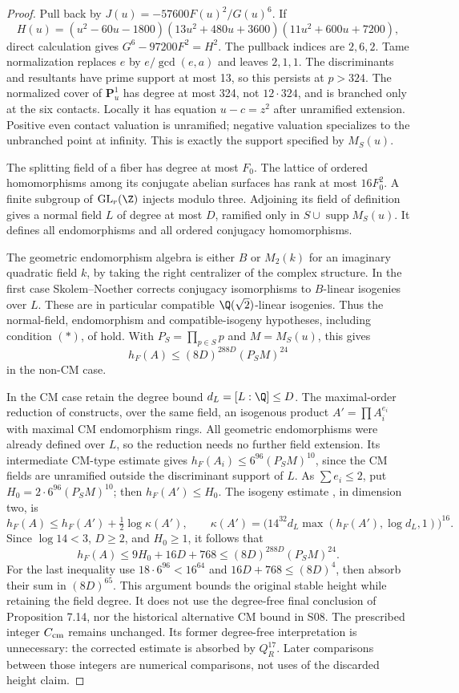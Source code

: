 \begin{proof}
Pull back by $J(u)=-57600F(u)^2/G(u)^6$. If
\[
 H(u)=(u^2-60u-1800)(13u^2+480u+3600)(11u^2+600u+7200),
\]
direct calculation gives $G^6-97200F^2=H^2$. The pullback indices are
$2,6,2$. Tame normalization replaces $e$ by $e/\gcd(e,a)$ and leaves
$2,1,1$. The discriminants and resultants have prime support at most 13,
so this persists at $p>324$. The normalized cover of $\mathbf P^1_u$
has degree at most 324, not $12\cdot324$, and is branched only at the
six contacts. Locally it has equation $u-c=z^2$ after unramified
extension. Positive even contact valuation is unramified; negative
valuation specializes to the unbranched point at infinity. This is
exactly the support specified by $M_S(u)$.

The splitting field of a fiber has degree at most $F_0$. The lattice
of ordered homomorphisms among its conjugate abelian surfaces has rank
at most $16F_0^2$. A finite subgroup of $\operatorname{GL}_r(\Z)$
injects modulo three. Adjoining its field of definition gives a normal
field $L$ of degree at most $D$, ramified only in
$S\cup\operatorname{supp}M_S(u)$. It defines all endomorphisms and all
ordered conjugacy homomorphisms.

The geometric endomorphism algebra is either $B$ or $M_2(k)$ for an
imaginary quadratic field $k$, by taking the right centralizer of the
complex structure. In the first case Skolem--Noether corrects conjugacy
isomorphisms to $B$-linear isogenies over $L$. These are in particular
compatible $\Q(\sqrt2)$-linear isogenies. Thus the normal-field,
endomorphism and compatible-isogeny hypotheses, including condition $(*)$,
of \cite[Eq. (7.1), Section 7.1.4, Proposition 7.13]{vkk} hold.
With $P_S=\prod_{p\in S}p$ and $M=M_S(u)$, this gives
\[
 h_F(A)\le(8D)^{288D}(P_SM)^{24}
\]
in the non-CM case.

In the CM case retain the degree bound $d_L=[L:\Q]\le D$.
The maximal-order reduction of \cite[Section 7.3.3, Eq. (7.17)]{vkk}
constructs, over the same field, an isogenous product
$A'=\prod A_i^{e_i}$ with maximal CM endomorphism rings. All geometric
endomorphisms were already defined over $L$, so the reduction needs
no further field extension. Its intermediate CM-type estimate gives
$h_F(A_i)\le6^{96}(P_SM)^{10}$, since the CM fields are unramified
outside the discriminant support of $L$. As $\sum e_i\le2$, put
$H_0=2\cdot6^{96}(P_SM)^{10}$; then $h_F(A')\le H_0$.
The isogeny estimate \cite[Eq. (7.13)]{vkk}, in dimension two, is
\[
 h_F(A)\le h_F(A')+\tfrac12\log\kappa(A'),\qquad
 \kappa(A')=\bigl(14^{32}d_L
             \max(h_F(A'),\log d_L,1)\bigr)^{16}.
\]
Since $\log14<3$, $D\ge2$, and $H_0\ge1$, it follows that
\[
 h_F(A)\le9H_0+16D+768\le(8D)^{288D}(P_SM)^{24}.
\]
For the last inequality use $18\cdot6^{96}<16^{64}$ and
$16D+768\le(8D)^4$, then absorb their sum in $(8D)^{65}$.
This argument bounds the original stable height while retaining the
field degree. It does not use the degree-free final conclusion of
Proposition 7.14, nor the historical alternative CM bound in S08.
The prescribed integer $C_{\rm cm}$ remains unchanged. Its former
degree-free interpretation is unnecessary: the corrected estimate is
absorbed by $Q_R^{17}$. Later comparisons between those integers are
numerical comparisons, not uses of the discarded height claim.


\end{proof}
